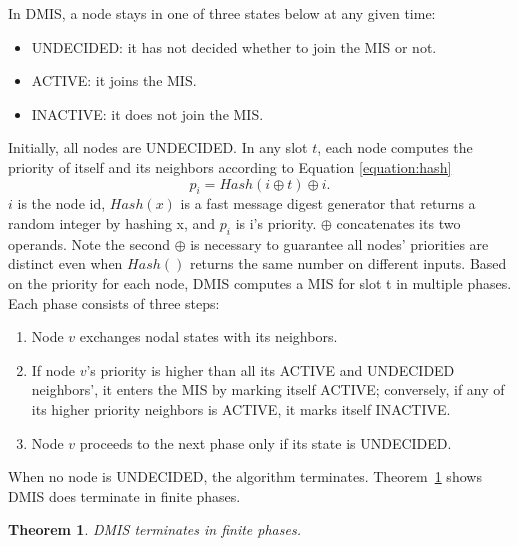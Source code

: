 \documentclass[conference]{IEEEtran}
\newtheorem{theorem}{Theorem}
\begin{document}
In DMIS, a node stays in one of three states below at any given time: 
\begin{itemize}
	\item	UNDECIDED:  	it has not decided whether to join the MIS or not.
	\item	ACTIVE: 		it joins the MIS.
	\item	INACTIVE: 	it does not join the MIS.
\end{itemize}
Initially, all nodes are UNDECIDED. In any slot $t$, each node computes the priority of itself and its neighbors according to Equation \ref{equation:hash}
\begin{equation}		\label{equation:hash}
p_i = Hash(i \oplus t) \oplus i.
\end{equation}
$i$ is the node id, $Hash(x)$ is a fast message digest generator that returns a random integer by hashing x, and $p_i$ is i's priority. $\oplus$ concatenates its two operands. Note the second $\oplus$ is necessary to guarantee all nodes' priorities are distinct even when $Hash()$ returns the same number on different inputs. Based on the priority for each node, DMIS computes a MIS for slot t in multiple phases. Each phase consists of three steps:
\begin{enumerate}
  \item Node $v$ exchanges nodal states with its neighbors. \label{enum:state_exchange} \item If node $v$'s priority is higher than all its ACTIVE and UNDECIDED neighbors', it enters the MIS by marking itself ACTIVE; conversely, if any of its higher priority neighbors is ACTIVE, it marks itself INACTIVE.	\label{enum:state_transition}
  \item Node $v$ proceeds to the next phase only if its state is UNDECIDED.
\end{enumerate}
When no node is UNDECIDED, the algorithm terminates.
Theorem~\ref{theorem:dmisconvergence} shows DMIS does terminate in finite phases.
\begin{theorem}		\label{theorem:dmisconvergence}
DMIS terminates in finite phases.
\end{theorem}
\end{document}
